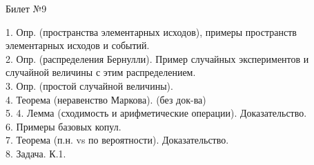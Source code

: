\documentclass[preview]{standalone}
\begin{document}
 
\begin{center} {\Large Билет №9} \end{center} 

1.  Опр. (пространства элементарных исходов), примеры пространств элементарных исходов и событий.\\

2.  Опр. (распределения Бернулли).  Пример случайных экспериментов и случайной величины с этим распределением.\\

3.  Опр. (простой случайной величины).\\

4.  Теорема (неравенство Маркова). (без док-ва)\\

5. 4. Лемма (сходимость и арифметические операции). Доказательство.\\

6.  Примеры базовых копул.\\

7.  Теорема (п.н. vs по вероятности). Доказательство.\\

8. Задача. К.1.\\
\end{document}

